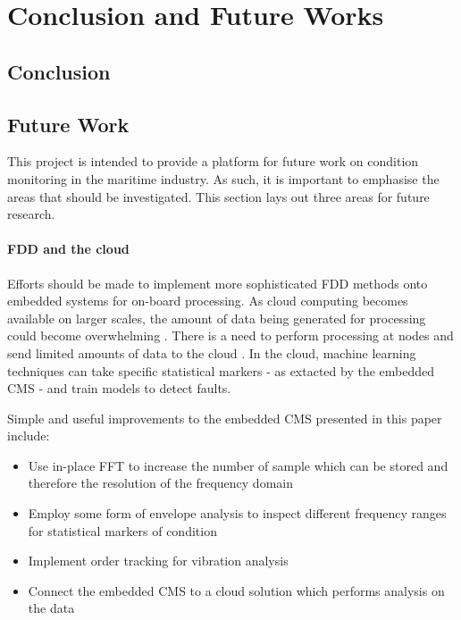 \chapter{Conclusion and Future Works}

\section{Conclusion}




\section{Future Work}

This project is intended to provide a platform for future work on condition monitoring in the maritime industry.
As such, it is important to emphasise the areas that should be investigated.
This section lays out three areas for future research.

\subsubsection{FDD and the cloud}

Efforts should be made to implement more sophisticated FDD methods onto embedded systems for on-board processing.
As cloud computing becomes available on larger scales, the amount of data being generated for processing could become overwhelming \cite{FutureInternet}.
There is a need to perform processing at nodes and send limited amounts of data to the cloud \cite{CM_cloud}.
In the cloud, machine learning techniques can take specific statistical markers - as extacted by the embedded CMS - and train models to detect faults.
\par

Simple and useful improvements to the embedded CMS presented in this paper include:
\begin{itemize}
    \item Use in-place FFT to increase the number of sample which can be stored and therefore the resolution of the frequency domain
    \item Employ some form of envelope analysis to inspect different frequency ranges for statistical markers of condition
    \item Implement order tracking for vibration analysis
    \item Connect the embedded CMS to a cloud solution which performs analysis on the data
\end{itemize}

